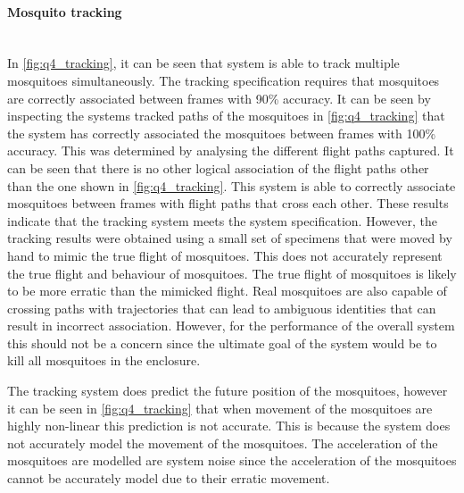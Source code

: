 \paragraph{Mosquito tracking}\hfill\\
In \autoref{fig:q4_tracking}, it can be seen that system is able to track multiple mosquitoes simultaneously. The tracking specification requires that mosquitoes are correctly associated between frames with 90\% accuracy. It can be seen by inspecting the systems tracked paths of the mosquitoes in \autoref{fig:q4_tracking} that the system has correctly associated the mosquitoes between frames with 100\% accuracy. This was determined by analysing the different flight paths captured. It can be seen that there is no other logical association of the flight paths other than the one shown in \autoref{fig:q4_tracking}. This system is able to correctly associate mosquitoes between frames with flight paths that cross each other. These results indicate that the tracking system meets the system specification. However, the tracking results were obtained using a small set of specimens that were moved by hand to mimic the true flight of mosquitoes. This does not accurately represent the true flight and behaviour of mosquitoes. The true flight of mosquitoes is likely to be more erratic than the mimicked flight. Real mosquitoes are also capable of crossing paths with trajectories that can lead to ambiguous identities that can result in incorrect association. However, for the performance of the overall system this should not be a concern since the ultimate goal of the system would be to kill all mosquitoes in the enclosure.

The tracking system does predict the future position of the mosquitoes, however it can be seen in \autoref{fig:q4_tracking} that when movement of the mosquitoes are highly non-linear this prediction is not accurate. This is because the system does not accurately model the movement of the mosquitoes. The acceleration of the mosquitoes are modelled are system noise since the acceleration of the mosquitoes cannot be accurately model due to their erratic movement.

